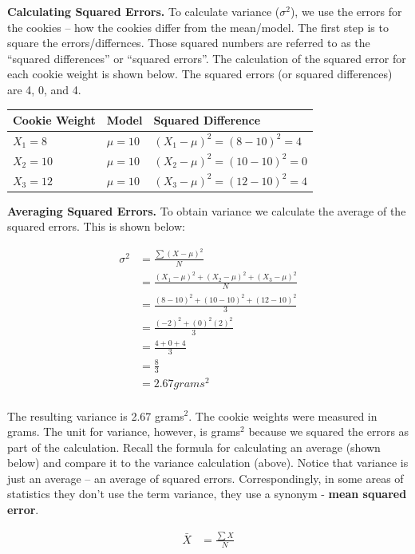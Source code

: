 \documentclass[
]{krantz}
\begin{document}
\textbf{Calculating Squared Errors.} To calculate variance (\(\sigma^2\)), we use the errors for the cookies -- how the cookies differ from the mean/model. The first step is to square the errors/differnces. Those squared numbers are referred to as the ``squared differences'' or ``squared errors''. The calculation of the squared error for each cookie weight is shown below. The squared errors (or squared differences) are 4, 0, and 4.

\begin{longtable}[]{@{}lll@{}}
\toprule
Cookie Weight & Model & Squared Difference\tabularnewline
\midrule
\endhead
\(X_1 = 8\) & \(\mu = 10\) & \((X_1 - \mu)^2 =(8 - 10)^2= 4\)\tabularnewline
\(X_2 = 10\) & \(\mu = 10\) & \((X_2 - \mu)^2 =(10 - 10)^2= 0\)\tabularnewline
\(X_3 = 12\) & \(\mu = 10\) & \((X_3 - \mu)^2 =(12 - 10)^2= 4\)\tabularnewline
\bottomrule
\end{longtable}

\textbf{Averaging Squared Errors.} To obtain variance we calculate the average of the squared errors. This is shown below:

\[
\begin{aligned} 
\sigma^2 &= \frac{\sum{(X - \mu)^2}}{N}\\
&= \frac{(X_1-\mu)^2 + (X_2-\mu)^2 + (X_3-\mu)^2}{N}  \\ 
&= \frac{(8-10)^2 + (10-10)^2 + (12-10)^2}{3}\\
&= \frac{(-2)^2 + (0)^2 (2)^2}{3} \\
&= \frac{4 + 0 + 4}{3} \\
&= \frac{8}{3} \\
&= 2.67 grams^2 \\
\end{aligned} 
\]

The resulting variance is 2.67 grams\(^2\). The cookie weights were measured in grams. The unit for variance, however, is grams\(^2\) because we squared the errors as part of the calculation. Recall the formula for calculating an average (shown below) and compare it to the variance calculation (above). Notice that variance is just an average -- an average of squared errors. Correspondingly, in some areas of statistics they don't use the term variance, they use a synonym - \textbf{mean squared error}.

\[
\begin{aligned} 
\bar{X} &= \frac{\sum{X}}{N} \\
\end{aligned} 
\]
\end{document}
